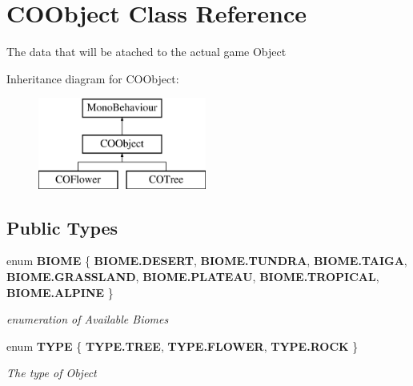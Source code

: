 \section{C\+O\+Object Class Reference}
\label{class_c_o_object}


The data that will be atached to the actual game Object  


Inheritance diagram for C\+O\+Object\+:\begin{figure}[H]
\begin{center}
\leavevmode
\includegraphics[height=3.000000cm]{class_c_o_object}
\end{center}
\end{figure}
\subsection*{Public Types}
\begin{DoxyCompactItemize}
\item 
enum \textbf{ B\+I\+O\+ME} \{ \newline
\textbf{ B\+I\+O\+M\+E.\+D\+E\+S\+E\+RT}, 
\textbf{ B\+I\+O\+M\+E.\+T\+U\+N\+D\+RA}, 
\textbf{ B\+I\+O\+M\+E.\+T\+A\+I\+GA}, 
\textbf{ B\+I\+O\+M\+E.\+G\+R\+A\+S\+S\+L\+A\+ND}, 
\newline
\textbf{ B\+I\+O\+M\+E.\+P\+L\+A\+T\+E\+AU}, 
\textbf{ B\+I\+O\+M\+E.\+T\+R\+O\+P\+I\+C\+AL}, 
\textbf{ B\+I\+O\+M\+E.\+A\+L\+P\+I\+NE}
 \}\begin{DoxyCompactList}\small\item\em enumeration of Available Biomes \end{DoxyCompactList}
\item 
enum \textbf{ T\+Y\+PE} \{ \textbf{ T\+Y\+P\+E.\+T\+R\+EE}, 
\textbf{ T\+Y\+P\+E.\+F\+L\+O\+W\+ER}, 
\textbf{ T\+Y\+P\+E.\+R\+O\+CK}
 \}\begin{DoxyCompactList}\small\item\em The type of Object \end{DoxyCompactList}
\end{DoxyCompactItemize}
